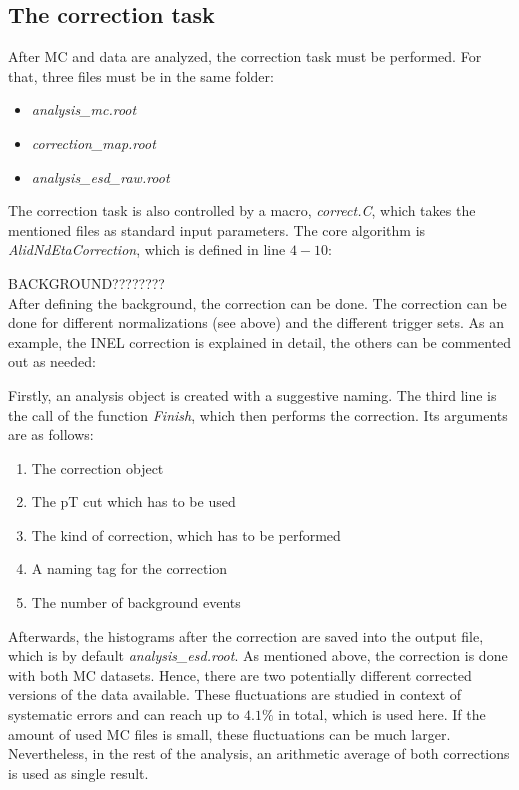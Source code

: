 \documentclass{article}
\begin{document}
\subsection{The correction task}
\label{subsec:correction}
After MC and data are analyzed, the correction task must be performed. For that, three files must be in the same folder:
\begin{itemize}
\item \textit{analysis\_mc.root}
\item \textit{correction\_map.root}
\item \textit{analysis\_esd\_raw.root}
\end{itemize}
The correction task is also controlled by a macro, \textit{correct.C}, which takes the mentioned files as standard input parameters. The core algorithm is \textit{AlidNdEtaCorrection}, which is defined in line $4-10$:




BACKGROUND???????? \\



After defining the background, the correction can be done. The correction can be done for different normalizations (see above) and the different trigger sets. As an example, the INEL correction is explained in detail, the others can be commented out as needed:

Firstly, an analysis object is created with a suggestive naming. The third line is the call of the function \textit{Finish}, which then performs the correction. Its arguments are as follows:
\begin{enumerate}
\item The correction object
\item The pT cut which has to be used
\item The kind of correction, which has to be performed
\item A naming tag for the correction
\item The number of background events
\end{enumerate}
Afterwards, the histograms after the correction are saved into the output file, which is by default \textit{analysis\_esd.root}. As mentioned above, the correction is done with both MC datasets. Hence, there are two potentially different corrected versions of the data available. These fluctuations are studied in context of systematic errors and can reach up to $4.1\%$ in total, which is used here. If the amount of used MC files is small, these fluctuations can be much larger. Nevertheless, in the rest of the analysis, an arithmetic average of both corrections is used as single result.
\end{document}
